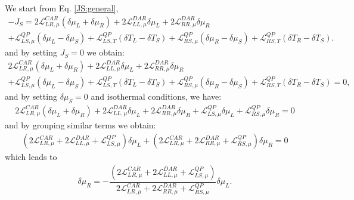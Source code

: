 We start from Eq. \eqref{JS:general}, 
\begin{multline*}
-J_{S}=
2\mathcal{L}_{LR,\mu}^{CAR}\left(\delta\mu_{L}+\delta\mu_{R}\right)
+
2\mathcal{L}_{LL,\mu}^{DAR}\delta\mu_{L}
+
2\mathcal{L}_{RR,\mu}^{DAR}\delta\mu_{R}
\\+
\mathcal{L}^{QP}_{LS,\mu}(\delta\mu_{L}-\delta\mu_{S})
+
\mathcal{L}^{QP}_{LS,T}(\delta T_{L}-\delta T_{S})
+
\mathcal{L}^{QP}_{RS,\mu}(\delta\mu_{R}-\delta\mu_{S})
+
\mathcal{L}^{QP}_{RS,T}(\delta T_{R}-\delta T_{S}).
\end{multline*}
and by setting $J_{S}=0$ we obtain:
\begin{multline*}
2\mathcal{L}_{LR,\mu}^{CAR}\left(\delta\mu_{L}+\delta\mu_{R}\right)
+
2\mathcal{L}_{LL,\mu}^{DAR}\delta\mu_{L}
+
2\mathcal{L}_{RR,\mu}^{DAR}\delta\mu_{R}
\\+
\mathcal{L}^{QP}_{LS,\mu}(\delta\mu_{L}-\delta\mu_{S})
+
\mathcal{L}^{QP}_{LS,T}(\delta T_{L}-\delta T_{S})
+
\mathcal{L}^{QP}_{RS,\mu}(\delta\mu_{R}-\delta\mu_{S})
+
\mathcal{L}^{QP}_{RS,T}(\delta T_{R}-\delta T_{S})=0,
\end{multline*}
and by setting $\delta\mu_{S}=0$ and isothermal conditions, we have:
\begin{align*}
2\mathcal{L}_{LR,\mu}^{CAR}\left(\delta\mu_{L}+\delta\mu_{R}\right)
+
2\mathcal{L}_{LL,\mu}^{DAR}\delta\mu_{L}
+
2\mathcal{L}_{RR,\mu}^{DAR}\delta\mu_{R}
+
\mathcal{L}^{QP}_{LS,\mu}\delta\mu_{L}
+
\mathcal{L}^{QP}_{RS,\mu}\delta\mu_{R}
=0
\end{align*}
and by grouping similar terms we obtain:
\begin{align*}
(2\mathcal{L}_{LR,\mu}^{CAR}+
2\mathcal{L}_{LL,\mu}^{DAR}+
\mathcal{L}^{QP}_{LS,\mu})\delta\mu_{L}
+
(2\mathcal{L}_{LR,\mu}^{CAR}
+
2\mathcal{L}_{RR,\mu}^{DAR}
+
\mathcal{L}^{QP}_{RS,\mu})\delta\mu_{R}
=0
\end{align*}
which leads to
\begin{align*}
\delta\mu_{R}
=-\dfrac{(2\mathcal{L}_{LR,\mu}^{CAR}+
2\mathcal{L}_{LL,\mu}^{DAR}+
\mathcal{L}^{QP}_{LS,\mu})}{2\mathcal{L}_{LR,\mu}^{CAR}
+
2\mathcal{L}_{RR,\mu}^{DAR}
+
\mathcal{L}^{QP}_{RS,\mu}}\delta\mu_{L}.
\end{align*}

